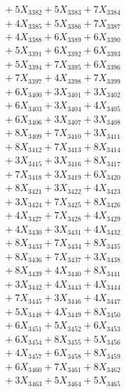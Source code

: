 \documentclass[a4paper,10pt]{article}
\begin{document}
{\begin{align}
&\;  + 5 X_{3382} + 5 X_{3383} + 7 X_{3384} \\[0.3ex]
&\;  + 4 X_{3385} + 5 X_{3386} + 7 X_{3387} \\[0.3ex]
&\;  + 4 X_{3388} + 6 X_{3389} + 6 X_{3390} \\[0.3ex]
&\;  + 5 X_{3391} + 6 X_{3392} + 6 X_{3393} \\[0.3ex]
&\;  + 5 X_{3394} + 7 X_{3395} + 6 X_{3396} \\[0.3ex]
&\;  + 7 X_{3397} + 4 X_{3398} + 7 X_{3399} \\[0.5ex]\allowbreak
&\;  + 6 X_{3400} + 3 X_{3401} + 3 X_{3402} \\[0.3ex]
&\;  + 6 X_{3403} + 3 X_{3404} + 4 X_{3405} \\[0.3ex]
&\;  + 6 X_{3406} + 3 X_{3407} + 3 X_{3408} \\[0.3ex]
&\;  + 8 X_{3409} + 7 X_{3410} + 3 X_{3411} \\[0.3ex]
&\;  + 8 X_{3412} + 7 X_{3413} + 8 X_{3414} \\[0.3ex]
&\;  + 3 X_{3415} + 3 X_{3416} + 8 X_{3417} \\[0.3ex]
&\;  + 7 X_{3418} + 3 X_{3419} + 6 X_{3420} \\[0.3ex]
&\;  + 8 X_{3421} + 3 X_{3422} + 4 X_{3423} \\[0.3ex]
&\;  + 3 X_{3424} + 7 X_{3425} + 8 X_{3426} \\[0.3ex]
&\;  + 4 X_{3427} + 7 X_{3428} + 4 X_{3429} \\[0.5ex]\allowbreak
&\;  + 4 X_{3430} + 3 X_{3431} + 4 X_{3432} \\[0.3ex]
&\;  + 8 X_{3433} + 7 X_{3434} + 8 X_{3435} \\[0.3ex]
&\;  + 8 X_{3436} + 7 X_{3437} + 3 X_{3438} \\[0.3ex]
&\;  + 8 X_{3439} + 4 X_{3440} + 8 X_{3441} \\[0.3ex]
&\;  + 3 X_{3442} + 4 X_{3443} + 4 X_{3444} \\[0.3ex]
&\;  + 7 X_{3445} + 3 X_{3446} + 4 X_{3447} \\[0.3ex]
&\;  + 5 X_{3448} + 4 X_{3449} + 8 X_{3450} \\[0.3ex]
&\;  + 6 X_{3451} + 5 X_{3452} + 6 X_{3453} \\[0.3ex]
&\;  + 6 X_{3454} + 8 X_{3455} + 5 X_{3456} \\[0.3ex]
&\;  + 4 X_{3457} + 6 X_{3458} + 8 X_{3459} \\[0.5ex]\allowbreak
&\;  + 6 X_{3460} + 7 X_{3461} + 8 X_{3462} \\[0.3ex]
&\;  + 3 X_{3463} + 5 X_{3464} + 5 X_{3465} \\[0.3ex]

\end{align}}
\end{document}
